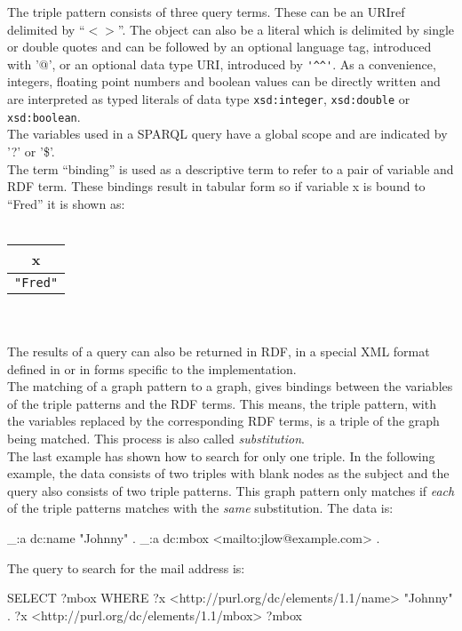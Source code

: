 \documentclass[11pt,a4paper,headsepline, bibtotoc]{scrreprt}
\begin{document}
The triple pattern consists of three query terms. These can be an URIref delimited by ``$<$$>$''. The object can also be a literal which is delimited by single or double quotes and can be followed by an optional language tag, introduced with '@', or an optional data type URI, introduced by \lstinline!'^^'!. As a convenience, integers, floating point numbers and boolean values can be directly written and are interpreted as typed literals of data type \texttt{xsd:integer}, \texttt{xsd:double} or \texttt{xsd:boolean}.\\
The variables used in a SPARQL query have a global scope and are indicated by '?' or '\$'.\\
The term ``binding'' is used as a descriptive term to refer to a pair of variable and RDF term. These bindings result in tabular form so if variable x is bound to ``Fred'' it is shown as:\\ \\
\begin{tabular}[c]{|c|}\hline
{\sf\bf x} \\ \hline
{\tt "Fred"}\\ \hline
\end{tabular}\\ \\
The results of a query can also be returned in RDF, in a special XML format defined in \cite{SPARQL:Result} or in forms specific to the implementation.\\
The matching of a graph pattern to a graph, gives bindings between the variables of the triple patterns and the RDF terms. This means, the triple pattern, with the variables replaced by the corresponding RDF terms, is a triple of the graph being matched. This process is also called \textit{substitution}.\\
The last example has shown how to search for only one triple. In the following example, the data consists of two triples with blank nodes as the subject and the query also consists of two triple patterns. This graph pattern only matches if \textit{each} of the triple patterns matches with the \textit{same} substitution. The data is:
\begin{blank}
_:a dc:name "Johnny" .
_:a dc:mbox <mailto:jlow@example.com> .
\end{blank}
The query to search for the mail address is:
\begin{blank}
SELECT ?mbox
WHERE { ?x <http://purl.org/dc/elements/1.1/name> "Johnny" .
        ?x <http://purl.org/dc/elements/1.1/mbox> ?mbox }
\end{blank}
$$
\end{document}
